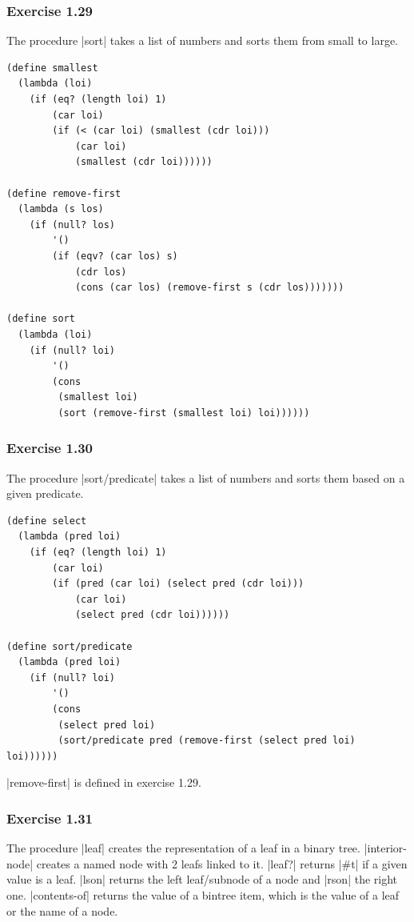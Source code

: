 \documentclass[a4paper]{article}
\begin{document}
\subsubsection{Exercise 1.29}

The procedure |sort| takes a list of numbers and sorts them from small to large.

\begin{lstlisting}
(define smallest
  (lambda (loi)
    (if (eq? (length loi) 1)
        (car loi)
        (if (< (car loi) (smallest (cdr loi)))
            (car loi)
            (smallest (cdr loi))))))

(define remove-first
  (lambda (s los)
    (if (null? los)
        '()
        (if (eqv? (car los) s)
            (cdr los)
            (cons (car los) (remove-first s (cdr los)))))))

(define sort
  (lambda (loi)
    (if (null? loi)
        '()
        (cons
         (smallest loi)
         (sort (remove-first (smallest loi) loi))))))
\end{lstlisting}

\subsubsection{Exercise 1.30}

The procedure |sort/predicate| takes a list of numbers and sorts them based on a given predicate.

\begin{lstlisting}
(define select
  (lambda (pred loi)
    (if (eq? (length loi) 1)
        (car loi)
        (if (pred (car loi) (select pred (cdr loi)))
            (car loi)
            (select pred (cdr loi))))))

(define sort/predicate
  (lambda (pred loi)
    (if (null? loi)
        '()
        (cons
         (select pred loi)
         (sort/predicate pred (remove-first (select pred loi) loi))))))
\end{lstlisting}

|remove-first| is defined in exercise 1.29.

\subsubsection{Exercise 1.31}

The procedure |leaf| creates the representation of a leaf in a binary tree. |interior-node| creates a named node with 2 leafs linked to it. |leaf?| returns |#t| if a given value is a leaf. |lson| returns the left leaf/subnode of a node and |rson| the right one. |contents-of| returns the value of a bintree item, which is the value of a leaf or the name of a node.
\end{document}
